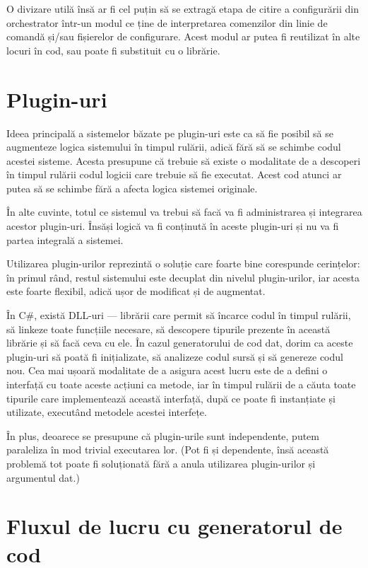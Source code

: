 \documentclass{report}
\begin{document}
O divizare utilă însă ar fi cel puțin să se extragă etapa de citire a configurării din orchestrator într-un modul ce ține de interpretarea comenzilor din linie de comandă și/sau fișierelor de configurare.
Acest modul ar putea fi reutilizat în alte locuri în cod, sau poate fi substituit cu o librărie.

\section{Plugin-uri}

Ideea principală a sistemelor băzate pe plugin-uri este ca să fie posibil să se augmenteze logica sistemului în timpul rulării, adică fără să se schimbe codul acestei sisteme.
Acesta presupune că trebuie să existe o modalitate de a descoperi în timpul rulării codul logicii care trebuie să fie executat.
Acest cod atunci ar putea să se schimbe fără a afecta logica sistemei originale.

În alte cuvinte, totul ce sistemul va trebui să facă va fi administrarea și integrarea acestor plugin-uri.
Însăși logică va fi conținută în aceste plugin-uri și nu va fi partea integrală a sistemei.

Utilizarea plugin-urilor reprezintă o soluție care foarte bine corespunde cerințelor: în primul rând, restul sistemului este decuplat din nivelul plugin-urilor, iar acesta este foarte flexibil, adică ușor de modificat și de augmentat.

În C\#, există DLL-uri --- librării care permit să încarce codul în timpul rulării, să linkeze toate funcțiile necesare, să descopere tipurile prezente în această librărie și să facă ceva cu ele.
În cazul generatorului de cod dat, dorim ca aceste plugin-uri să poată fi inițializate, să analizeze codul sursă și să genereze codul nou.
Cea mai ușoară modalitate de a asigura acest lucru este de a defini o interfață cu toate aceste acțiuni ca metode, iar în timpul rulării de a căuta toate tipurile care implementează această interfață, după ce poate fi instanțiate și utilizate, executând metodele acestei interfețe. 

În plus, deoarece se presupune că plugin-urile sunt independente, putem paraleliza în mod trivial executarea lor.
(Pot fi și dependente, însă această problemă tot poate fi soluționată fără a anula utilizarea plugin-urilor și argumentul dat.)

\section{Fluxul de lucru cu generatorul de cod}
\end{document}
